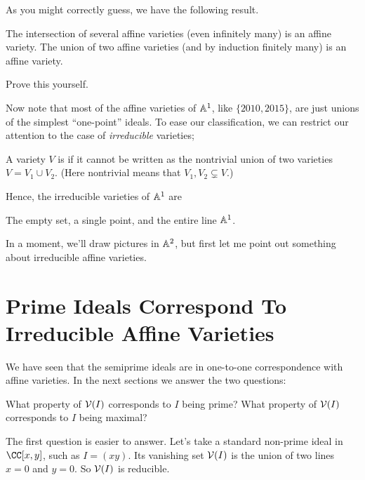 As you might correctly guess, we have the following result.
\begin{theorem}
	\listhack
	\begin{enumerate}[(a)]
		\ii The intersection of several affine varieties (even infinitely many) is an affine variety.
		\ii The union of two affine varieties (and by induction finitely many) is an affine variety.
	\end{enumerate}
\end{theorem}
\begin{exercise}
	Prove this yourself.
\end{exercise}

Now note that most of the affine varieties of $\mathbb A^1$, like $\{2010,2015\}$,
are just unions of the simplest ``one-point'' ideals.
To ease our classification, we can restrict our attention to the case of \emph{irreducible} varieties;
\begin{definition}
	A variety $V$ is  if it cannot be written
	as the nontrivial union of two varieties $V = V_1 \cup V_2$.
	(Here nontrivial means that $V_1, V_2 \subsetneq V$.)
\end{definition}

Hence, the irreducible varieties of $\mathbb A^1$ are
\begin{enumerate}[(i)]
	\ii The empty set,
	\ii a single point, and
	\ii the entire line $\mathbb A^1$.
\end{enumerate}

In a moment, we'll draw pictures in $\mathbb A^2$,
but first let me point out something about irreducible affine varieties.

\section{Prime Ideals Correspond To Irreducible Affine Varieties}
We have seen that the semiprime ideals are in one-to-one correspondence with affine varieties.
In the next sections we answer the two questions:
\begin{itemize}
	\ii What property of $\mathcal V(I)$ corresponds to $I$ being prime?
	\ii What property of $\mathcal V(I)$ corresponds to $I$ being maximal?
\end{itemize}
The first question is easier to answer.
Let's take a standard non-prime ideal in $\CC[x,y]$, such as $I = (xy)$.
Its vanishing set $\mathcal V(I)$ is the union of two lines $x=0$ and $y=0$.
So $\mathcal V(I)$ is reducible.

